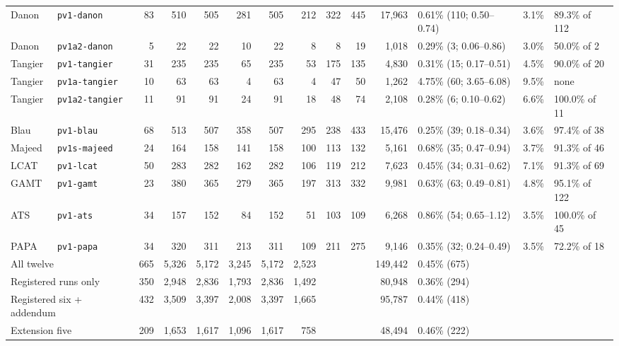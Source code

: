 \documentclass{article} %
\begin{document}
\begin{table}
\begin{center}
{\begin{tabular}{llrrrrrrrrrlll}
Danon & \texttt{pv1-danon} & 83 & 510 & 505 & 281 & 505 & 212 & 322 & 445 & 17,963 & 0.61\% (110; 0.50--0.74) & 3.1\% & 89.3\% of 112 \\
Danon & \texttt{pv1a2-danon} & 5 & 22 & 22 & 10 & 22 & 8 & 8 & 19 & 1,018 & 0.29\% (3; 0.06--0.86) & 3.0\% & 50.0\% of 2 \\
Tangier & \texttt{pv1-tangier} & 31 & 235 & 235 & 65 & 235 & 53 & 175 & 135 & 4,830 & 0.31\% (15; 0.17--0.51) & 4.5\% & 90.0\% of 20 \\
Tangier & \texttt{pv1a-tangier} & 10 & 63 & 63 & 4 & 63 & 4 & 47 & 50 & 1,262 & 4.75\% (60; 3.65--6.08) & 9.5\% & none \\
Tangier & \texttt{pv1a2-tangier} & 11 & 91 & 91 & 24 & 91 & 18 & 48 & 74 & 2,108 & 0.28\% (6; 0.10--0.62) & 6.6\% & 100.0\% of 11 \\
Blau & \texttt{pv1-blau} & 68 & 513 & 507 & 358 & 507 & 295 & 238 & 433 & 15,476 & 0.25\% (39; 0.18--0.34) & 3.6\% & 97.4\% of 38 \\
Majeed & \texttt{pv1s-majeed} & 24 & 164 & 158 & 141 & 158 & 100 & 113 & 132 & 5,161 & 0.68\% (35; 0.47--0.94) & 3.7\% & 91.3\% of 46 \\
LCAT & \texttt{pv1-lcat} & 50 & 283 & 282 & 162 & 282 & 106 & 119 & 212 & 7,623 & 0.45\% (34; 0.31--0.62) & 7.1\% & 91.3\% of 69 \\
GAMT & \texttt{pv1-gamt} & 23 & 380 & 365 & 279 & 365 & 197 & 313 & 332 & 9,981 & 0.63\% (63; 0.49--0.81) & 4.8\% & 95.1\% of 122 \\
ATS & \texttt{pv1-ats} & 34 & 157 & 152 & 84 & 152 & 51 & 103 & 109 & 6,268 & 0.86\% (54; 0.65--1.12) & 3.5\% & 100.0\% of 45 \\
PAPA & \texttt{pv1-papa} & 34 & 320 & 311 & 213 & 311 & 109 & 211 & 275 & 9,146 & 0.35\% (32; 0.24--0.49) & 3.5\% & 72.2\% of 18 \\
\midrule
\multicolumn{2}{l}{All twelve} & 665 & 5,326 & 5,172 & 3,245 & 5,172 & 2,523 & & & 149,442 & 0.45\% (675) & & \\
\multicolumn{2}{l}{Registered runs only} & 350 & 2,948 & 2,836 & 1,793 & 2,836 & 1,492 & & & 80,948 & 0.36\% (294) & & \\
\multicolumn{2}{l}{Registered six + addendum} & 432 & 3,509 & 3,397 & 2,008 & 3,397 & 1,665 & & & 95,787 & 0.44\% (418) & & \\
\multicolumn{2}{l}{Extension five} & 209 & 1,653 & 1,617 & 1,096 & 1,617 & 758 & & & 48,494 & 0.46\% (222) & & \\
\bottomrule
\end{tabular}}
\end{center}
\end{table}
\end{document}
